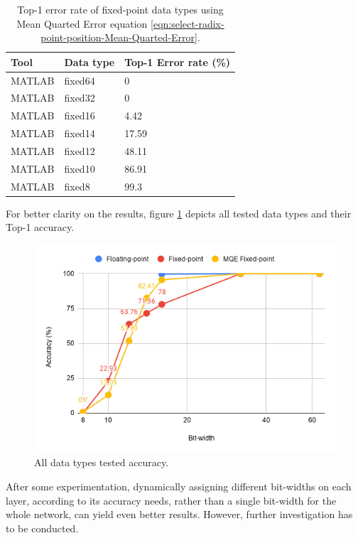 \begin{table}[H]
	\caption{Top-1 error rate of fixed-point data types using Mean Quarted Error equation \ref{eqn:select-radix-point-position-Mean-Quarted-Error}.}
	\label{tab:fixed-MQE-error-rates}
	\centering
	\begin{tabular}{lll}
		\toprule
		\textbf{Tool} & \textbf{Data type} & \textbf{Top-1 Error rate (\%)}\\
		\midrule
			MATLAB 	& fixed64	& 0 	\\
			MATLAB 	& fixed32	& 0 	\\
			MATLAB 	& fixed16	& 4.42 	\\
			MATLAB 	& fixed14	& 17.59 \\
			MATLAB 	& fixed12	& 48.11 \\
			MATLAB 	& fixed10	& 86.91	\\
			MATLAB 	& fixed8	& 99.3 	\\
		\bottomrule
	\end{tabular}
\end{table}

For better clarity on the results, figure \ref{fig:data-types-accuracy-chart} depicts all tested data types and their Top-1 accuracy.

\begin{figure} [H]
	\centering
	\includegraphics[width=\textwidth]{../Images/Weights-distributions/data-types-accuracy-chart.png}
	\decoRule
	\caption[All data types tested accuracy]{All data types tested accuracy.}
	\label{fig:data-types-accuracy-chart}
\end{figure}

After some experimentation, dynamically assigning different bit-widths on each layer, according to its accuracy needs, rather than a single bit-width for the whole network, can yield even better results. However, further investigation has to be conducted.

